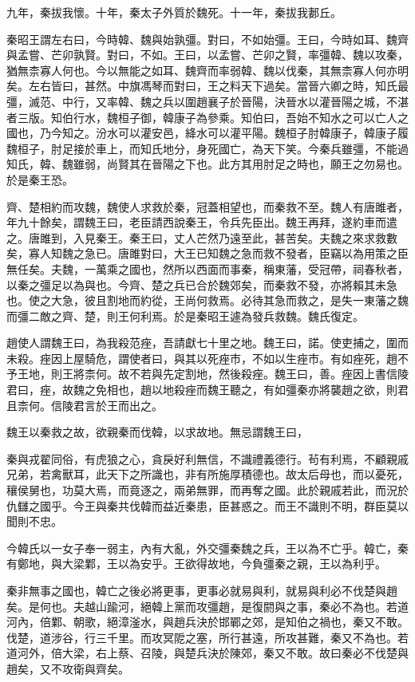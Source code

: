 九年，秦拔我懷。十年，秦太子外質於魏死。十一年，秦拔我郪丘。

秦昭王謂左右曰，今時韓、魏與始孰彊。對曰，不如始彊。王曰，今時如耳、魏齊與孟嘗、芒卯孰賢。對曰，不如。王曰，以孟嘗、芒卯之賢，率彊韓、魏以攻秦，猶無柰寡人何也。今以無能之如耳、魏齊而率弱韓、魏以伐秦，其無柰寡人何亦明矣。左右皆曰，甚然。中旗馮琴而對曰，王之料天下過矣。當晉六卿之時，知氏最彊，滅范、中行，又率韓、魏之兵以圍趙襄子於晉陽，決晉水以灌晉陽之城，不湛者三版。知伯行水，魏桓子御，韓康子為參乘。知伯曰，吾始不知水之可以亡人之國也，乃今知之。汾水可以灌安邑，絳水可以灌平陽。魏桓子肘韓康子，韓康子履魏桓子，肘足接於車上，而知氏地分，身死國亡，為天下笑。今秦兵雖彊，不能過知氏，韓、魏雖弱，尚賢其在晉陽之下也。此方其用肘足之時也，願王之勿易也。於是秦王恐。

齊、楚相約而攻魏，魏使人求救於秦，冠蓋相望也，而秦救不至。魏人有唐雎者，年九十餘矣，謂魏王曰，老臣請西說秦王，令兵先臣出。魏王再拜，遂約車而遣之。唐雎到，入見秦王。秦王曰，丈人芒然乃遠至此，甚苦矣。夫魏之來求救數矣，寡人知魏之急已。唐雎對曰，大王已知魏之急而救不發者，臣竊以為用策之臣無任矣。夫魏，一萬乘之國也，然所以西面而事秦，稱東藩，受冠帶，祠春秋者，以秦之彊足以為與也。今齊、楚之兵已合於魏郊矣，而秦救不發，亦將賴其未急也。使之大急，彼且割地而約從，王尚何救焉。必待其急而救之，是失一東藩之魏而彊二敵之齊、楚，則王何利焉。於是秦昭王遽為發兵救魏。魏氏復定。

趙使人謂魏王曰，為我殺范痤，吾請獻七十里之地。魏王曰，諾。使吏捕之，圍而未殺。痤因上屋騎危，謂使者曰，與其以死痤市，不如以生痤市。有如痤死，趙不予王地，則王將柰何。故不若與先定割地，然後殺痤。魏王曰，善。痤因上書信陵君曰，痤，故魏之免相也，趙以地殺痤而魏王聽之，有如彊秦亦將襲趙之欲，則君且柰何。信陵君言於王而出之。

魏王以秦救之故，欲親秦而伐韓，以求故地。無忌謂魏王曰，

秦與戎翟同俗，有虎狼之心，貪戾好利無信，不識禮義德行。茍有利焉，不顧親戚兄弟，若禽獸耳，此天下之所識也，非有所施厚積德也。故太后母也，而以憂死，穰侯舅也，功莫大焉，而竟逐之，兩弟無罪，而再奪之國。此於親戚若此，而況於仇讎之國乎。今王與秦共伐韓而益近秦患，臣甚惑之。而王不識則不明，群臣莫以聞則不忠。

今韓氏以一女子奉一弱主，內有大亂，外交彊秦魏之兵，王以為不亡乎。韓亡，秦有鄭地，與大梁鄴，王以為安乎。王欲得故地，今負彊秦之親，王以為利乎。

秦非無事之國也，韓亡之後必將更事，更事必就易與利，就易與利必不伐楚與趙矣。是何也。夫越山踰河，絕韓上黨而攻彊趙，是復閼與之事，秦必不為也。若道河內，倍鄴、朝歌，絕漳滏水，與趙兵決於邯鄲之郊，是知伯之禍也，秦又不敢。伐楚，道涉谷，行三千里。而攻冥阸之塞，所行甚遠，所攻甚難，秦又不為也。若道河外，倍大梁，右上蔡、召陵，與楚兵決於陳郊，秦又不敢。故曰秦必不伐楚與趙矣，又不攻衛與齊矣。

